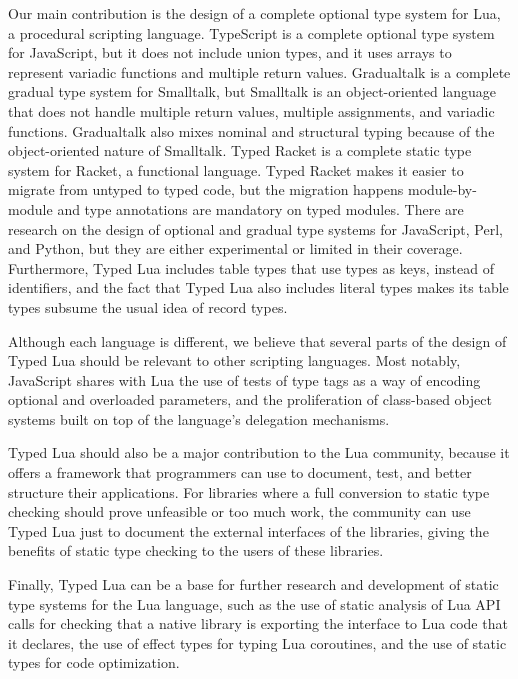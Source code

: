 Our main contribution is the design of a complete optional type system
for Lua, a procedural scripting language.
TypeScript is a complete optional type system for JavaScript,
but it does not include union types, and it uses arrays to represent
variadic functions and multiple return values.
Gradualtalk is a complete gradual type system for Smalltalk,
but Smalltalk is an object-oriented language that does
not handle multiple return values, multiple assignments, and
variadic functions.
Gradualtalk also mixes nominal and structural typing because of
the object-oriented nature of Smalltalk.
Typed Racket is a complete static type system for Racket, a functional
language.
Typed Racket makes it easier to migrate from untyped to typed code,
but the migration happens module-by-module and type annotations are
mandatory on typed modules.
There are research on the design of optional and gradual type systems
for JavaScript, Perl, and Python, but they are either experimental or
limited in their coverage.
Furthermore, Typed Lua includes table types that use types as keys,
instead of identifiers, and the fact that Typed Lua also includes
literal types makes its table types subsume the usual idea of
record types.

Although each language is different, we believe that several parts of
the design of Typed Lua should be relevant to other scripting languages.
Most notably, JavaScript shares with Lua the use of tests of type tags
as a way of encoding optional and overloaded parameters, and the
proliferation of class-based object systems built on top of the
language's delegation mechanisms.

Typed Lua should also be a major contribution to the Lua community,
because it offers a framework that programmers can use to document,
test, and better structure their applications.
For libraries where a full conversion to static type checking should
prove unfeasible or too much work, the community can use Typed Lua
just to document the external interfaces of the libraries,
giving the benefits of static type checking to the users of these
libraries.

Finally, Typed Lua can be a base for further research and development
of static type systems for the Lua language, such as the use of static
analysis of Lua API calls for checking that a native library is
exporting the interface to Lua code that it declares, the use of
effect types for typing Lua coroutines, and the use of static types
for code optimization.

